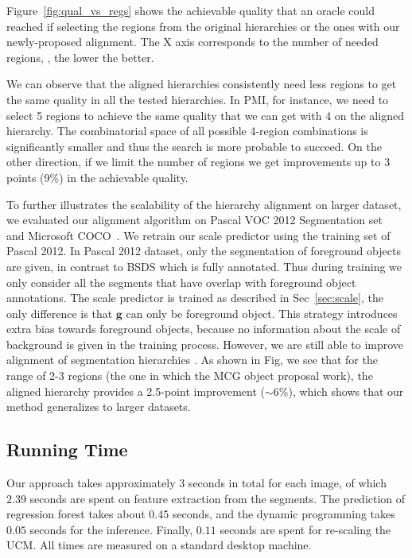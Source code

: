 Figure~\ref{fig:qual_vs_regs} shows the achievable quality
that an oracle could reached if selecting the regions from the
original hierarchies or the ones with our newly-proposed alignment.
The X axis corresponds to the number of needed regions, \ie, the lower
the better.

We can observe that the aligned hierarchies consistently need less
regions to get the same quality in all the tested hierarchies.  In
PMI, for instance, we need to select 5 regions to achieve the same
quality that we can get with 4 on the aligned hierarchy. The
combinatorial space of all possible 4-region combinations is
significantly smaller and thus the search is more probable to
succeed. On the other direction, if we limit the number of regions we
get improvements up to 3 points (9\%) in the achievable quality.

To further illustrates the scalability of the hierarchy alignment on larger dataset, we evaluated our alignment algorithm on Pascal VOC 2012 Segmentation set~\cite{everingham2010pascal} and Microsoft COCO~\cite{lin2014microsoft}. We retrain our scale predictor using the training set of Pascal 2012. In Pascal 2012 dataset, only the segmentation of foreground objects are given, in contrast to BSDS which is fully annotated. Thus during training we only consider all the segments that have overlap with foreground object annotations. The scale predictor is trained as described in Sec~\ref{sec:scale}, the only difference is that $\mathbf{g}$ can only be foreground object. This strategy introduces extra bias towards foreground objects, because no information about the scale of background is given in the training process. However, we are still able to improve alignment of segmentation hierarchies . As shown in Fig, we see that for the range of 2-3 regions (the one in which the MCG object proposal work), the aligned hierarchy provides a 2.5-point improvement ($\sim$6\%), which shows that our method generalizes to larger datasets. 

\subsection{Running Time}
Our approach takes approximately 3 seconds in total for each image, of which $2.39$
seconds are spent on feature extraction from the segments. The prediction
of regression forest takes about $0.45$ seconds, and the dynamic
programming takes $0.05$ seconds for the inference. Finally, $0.11$
seconds are spent for re-scaling the UCM.
All times are measured on a standard desktop machine.


